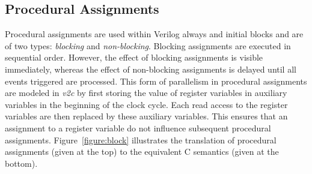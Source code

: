 \subsection{Procedural Assignments}
%
Procedural assignments are used within Verilog always and initial blocks and
are of two types: \emph{blocking} and \emph{non-blocking}.  Blocking
assignments are executed in sequential order.  However, the effect of
blocking assignments is visible immediately, whereas the effect of
non-blocking assignments is delayed until all events triggered are
processed.  This form of parallelism in procedural assignments are modeled
in \emph{v2c} by first storing the value of register variables in auxiliary
variables in the beginning of the clock cycle.  Each read access to the
register variables are then replaced by these auxiliary variables.  This
ensures that an assignment to a register variable do not influence
subsequent procedural assignments.  Figure~\ref{figure:block} illustrates
the translation of procedural assignments (given at the top) to the
equivalent C semantics (given at the bottom).
%
